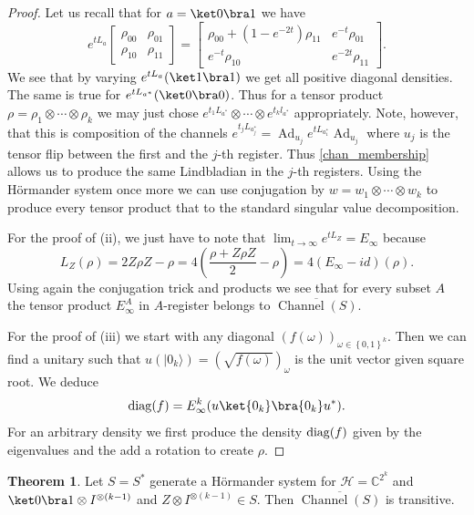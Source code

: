 \documentclass[11pt,reqno]{amsart}
\theoremstyle{definition}
\newtheorem{theorem}{Theorem}[section]
\newcommand{\mb}{\mathbb}
\newcommand{\mc}{\mathcal}
\newcommand{\lset}{\left\{ }
\newcommand{\rset}{\right\} }
\newcommand{\lpara}{\left(}
\newcommand{\rpara}{\right)}
\newcommand{\ran}{\rangle}
\newcommand{\kla}{\left[}
\newcommand{\mer}{\right]}
\newcommand{\ten}{\otimes}
\DeclareMathOperator{\Ad}{Ad}
\DeclareMathOperator{\chan}{Channel}
\begin{document}
\begin{proof}
    Let us recall \cite{CW} that for $a=\ket 0\bra 1$ we have
    \[ e^{tL_a}\kla \begin{array}{cc} \rho_{00}& \rho_{01} \\ 
    \rho_{10}& \rho_{11} \end{array}\mer =
    \kla \begin{array}{cc} \rho_{00}+(1-e^{-2t})\rho_{11}& e^{-t}\rho_{01} \\ 
    e^{-t}\rho_{10} & e^{-2t}\rho_{11} \end{array}\mer  .\] 
    We see that by varying $e^{tL_a}(\ket 1\bra 1)$ we get all positive diagonal densities.  The same is true for $e^{tL_{a^*}}(\ket 0\bra 0)$. Thus for a tensor product $\rho=\rho_{1}\otimes \cdots \otimes \rho_{k}$ we may just chose $e^{t_1L_{a^*}}\otimes \cdots \otimes e^{t_kl_{a^*}}$ appropriately. Note, however, that this is composition of the channels $e^{t_jL_{a_j^*}}= \Ad_{u_j} e^{tL_{a_1^*}}\Ad_{u_j}$ where $u_j$ is the tensor flip between the first and the $j$-th register. Thus \cref{chan_membership} allows us to produce the same Lindbladian in the $j$-th registers. Using the H\"ormander system once more we can use conjugation by $w=w_1\otimes \cdots \otimes w_k$ to produce every tensor product that to the standard singular value decomposition.

    For the proof of (ii), we just have to note that $\lim_{t\to \infty} e^{tL_Z}=E_{\infty}$ because 
    \[ L_Z(\rho) = 2Z\rho Z-\rho  = 4\lpara\frac{\rho+Z\rho Z}{2}-\rho\rpara
    = 4(E_{\infty}-id)(\rho)  .\] 
    Using again the conjugation trick and products we see that for every subset $A$ the tensor product $E_{\infty}^{A}$ in $A$-register belongs to $\overline{\chan(S)}$.

    For the proof of (iii) we start with any diagonal $(f(\omega))_{\omega \in \lset 0,1\rset^k}$. Then we can find a unitary such that $u(|0_k\ran)= (\sqrt{f(\omega)})_{\omega}$ is the unit vector given square root. We deduce 
    \[ {\rm diag}(f) = E_{\infty}^k(u\ket{0_k}\bra{0_k}u^*)  .\] 
    For an arbitrary density we first produce the density ${\rm diag}(f)$ given by the eigenvalues and the add a rotation to create $\rho$.
\end{proof}

\begin{theorem} \label{qubit_trans}
    Let $S=S^*$ generate a H\"ormander system for $\mc H=\mb C^{2^k}$ and $\ket 0\bra 1\otimes I^{\ten{(k-1)}}$ and $Z\otimes I^{\ten{(k-1)}}\in S$. Then $\overline{\chan(S)}$ is transitive.  
\end{theorem} 
\end{document}
